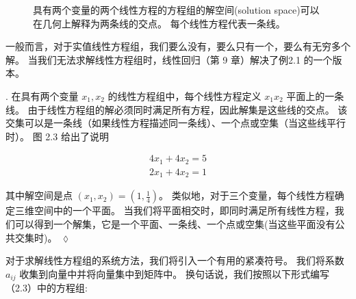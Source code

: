 \begin{figure}
    \caption{具有两个变量的两个线性方程的方程组的解空间(solution space)可以在几何上解释为两条线的交点。 每个线性方程代表一条线。}
\end{figure}

一般而言，对于实值线性方程组，我们要么没有，要么只有一个，要么有无穷多个解。
当我们无法求解线性方程组时，线性回归（第 9 章）解决了例2.1 的一个版本。

\begin{remark}[线性方程组的几何解释].
在具有两个变量 $x_1,x_2$ 的线性方程组中，每个线性方程定义 $x_1x_2$ 平面上的一条线。
由于线性方程组的解必须同时满足所有方程，因此解集是这些线的交点。
该交集可以是一条线（如果线性方程描述同一条线）、一个点或空集（当这些线平行时）。
图 2.3 给出了说明

\begin{equation}
    \begin{aligned}
        4x_1 + 4x_2 = 5\\
        2x_1 + 4x_2 = 1
    \end{aligned}
\end{equation}

其中解空间是点 $(x_1, x_2) = (1, \frac{1}{4})$。
类似地，对于三个变量，每个线性方程确定三维空间中的一个平面。
当我们将平面相交时，即同时满足所有线性方程，我们可以得到一个解集，它是一个平面、一条线、一个点或空集(当这些平面没有公共交集时)。
\hfill$\lozenge$
\end{remark}

对于求解线性方程组的系统方法，我们将引入一个有用的紧凑符号。
我们将系数 $a_{ij}$ 收集到向量中并将向量集中到矩阵中。
换句话说，我们按照以下形式编写（2.3）中的方程组:

